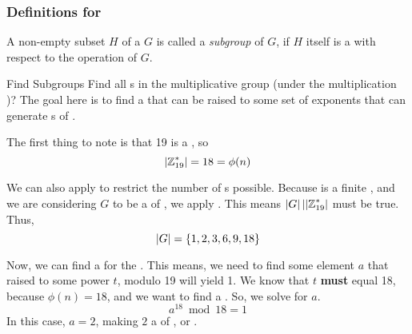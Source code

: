 \subsubsection{Definitions for }\label{subsubsec:Definitions_for_Groups}
\begin{definition}[Subgroup]\label{def:Subgroup}
  A non-empty subset $H$ of a  $G$ is called a \emph{subgroup} of $G$, if $H$ itself is a  with respect to the operation of $G$.
\end{definition}

\begin{example}{Find Subgroups}
  Find all s in the multiplicative group  (under the multiplication )?
  \tcblower{}
  The goal here is to find a  that can be raised to some set of exponents that can generate s of .

  The first thing to note is that 19 is a , so
  \begin{equation*}
    \lvert \operatorname{\mathbb{Z}}_{19}^{*} \rvert = 18 = \phi(n)
  \end{equation*}

  We can also apply  to restrict the number of s possible.
  Because  is a finite , and we are considering $G$ to be a  of , we apply .
  This means $\lvert G \rvert \operatorname{\vert} \lvert \operatorname{\mathbb{Z}}_{19}^{*} \rvert$ must be true.
  Thus,
  \begin{equation*}
    \lvert G \rvert = \lbrace 1, 2, 3, 6, 9, 18 \rbrace
  \end{equation*}

  Now, we can find a  for the  .
  This means, we need to find some element $a$ that raised to some power $t$, modulo 19 will yield 1.
  We know that $t$ \textbf{must} equal 18, because $\phi(n) = 18$, and we want to find a .
  So, we solve for $a$.
  \begin{equation*}
    a^{18} \bmod 18 = 1
  \end{equation*}
  In this case, $a = 2$, making $2$ a  of , or .


\end{example}
